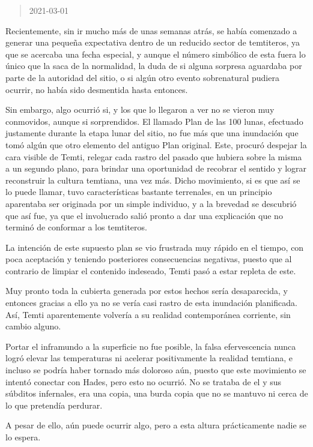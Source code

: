 \documentclass[
  spanish,
]{book}
\begin{document}
\begin{quote}
2021-03-01
\end{quote}

Recientemente, sin ir mucho más de unas semanas atrás, se había comenzado a generar una pequeña expectativa dentro de un reducido sector de temtiteros, ya que se acercaba una fecha especial, y aunque el número simbólico de esta fuera lo único que la saca de la normalidad, la duda de si alguna sorpresa aguardaba por parte de la autoridad del sitio, o si algún otro evento sobrenatural pudiera ocurrir, no había sido desmentida hasta entonces.

Sin embargo, algo ocurrió si, y los que lo llegaron a ver no se vieron muy conmovidos, aunque si sorprendidos. El llamado Plan de las 100 lunas, efectuado justamente durante la etapa lunar del sitio, no fue más que una inundación que tomó algún que otro elemento del antiguo Plan original. Este, procuró despejar la cara visible de Temti, relegar cada rastro del pasado que hubiera sobre la misma a un segundo plano, para brindar una oportunidad de recobrar el sentido y lograr reconstruir la cultura temtiana, una vez más. Dicho movimiento, si es que así se lo puede llamar, tuvo características bastante terrenales, en un principio aparentaba ser originada por un simple individuo, y a la brevedad se descubrió que así fue, ya que el involucrado salió pronto a dar una explicación que no terminó de conformar a los temtiteros.

La intención de este supuesto plan se vio frustrada muy rápido en el tiempo, con poca aceptación y teniendo posteriores consecuencias negativas, puesto que al contrario de limpiar el contenido indeseado, Temti pasó a estar repleta de este.

Muy pronto toda la cubierta generada por estos hechos sería desaparecida, y entonces gracias a ello ya no se vería casi rastro de esta inundación planificada. Así, Temti aparentemente volvería a su realidad contemporánea corriente, sin cambio alguno.

Portar el inframundo a la superficie no fue posible, la falsa efervescencia nunca logró elevar las temperaturas ni acelerar positivamente la realidad temtiana, e incluso se podría haber tornado más doloroso aún, puesto que este movimiento se intentó conectar con Hades, pero esto no ocurrió. No se trataba de el y sus súbditos infernales, era una copia, una burda copia que no se mantuvo ni cerca de lo que pretendía perdurar.

A pesar de ello, aún puede ocurrir algo, pero a esta altura prácticamente nadie se lo espera.
\end{document}
